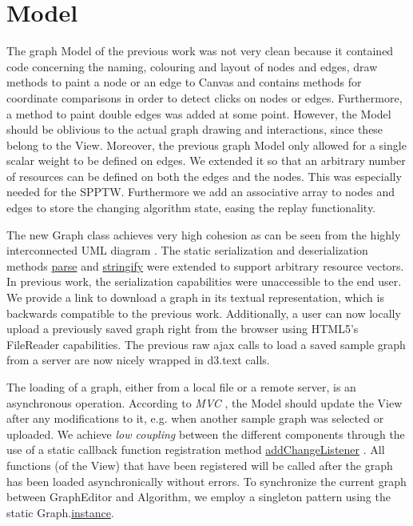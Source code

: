 \section{Model}
The graph Model of the previous work was not very clean because it contained code concerning the naming, colouring and layout of nodes and edges, draw methods to paint a node or an edge to Canvas and contains methods for coordinate comparisons in order to detect clicks on nodes or edges. Furthermore, a method to paint double edges was added at some point. However, the Model should be oblivious to the actual graph drawing and interactions, since these belong to the View. Moreover, the previous graph Model only allowed for a single scalar weight to be defined on edges. We extended it so that an arbitrary number of resources can be defined on both the edges and the nodes. This was especially needed for the SPPTW. Furthermore we add an associative array to nodes and edges to store the changing algorithm state, easing the replay functionality.

The new Graph class achieves very high cohesion as can be seen from the highly interconnected UML diagram . The static serialization and deserialization methods \underline{parse} and \underline{stringify} were extended to support arbitrary resource vectors. In previous work, the serialization capabilities were unaccessible to the end user. We provide a link to download a graph in its textual representation, which is backwards compatible to the previous work. Additionally, a user can now locally upload a previously saved graph right from the browser using HTML5's FileReader capabilities. The previous raw ajax calls to load a saved sample graph from a server are now nicely wrapped in d3.text calls.

The loading of a graph, either from a local file or a remote server, is an asynchronous operation. According to \textit{MVC} , the Model should update the View after any modifications to it, e.g. when another sample graph was selected or uploaded. We achieve \textit{low coupling}  between the different components through the use of a static callback function registration method \underline{addChangeListener} . All functions (of the View) that have been registered will be called after the graph has been loaded asynchronically without errors. To synchronize the current graph between GraphEditor and Algorithm, we employ a singleton pattern using the static Graph.\underline{instance}. 

